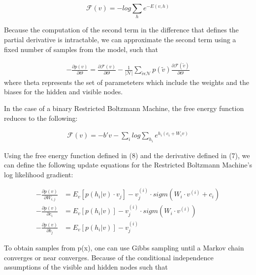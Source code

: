 \documentclass[journal]{IEEEtran}
\begin{document}
\begin{equation}
\mathcal{F}(v) = -log \sum\limits_{h}e^{-E(v,h)}
\end{equation}

Because the computation of the second term in the difference that defines the partial derivative is intractable, we can approximate the second term using a fixed number of samples from the model, such that 

\begin{equation}
\begin{aligned}
- \frac{\partial p(v)}{\partial \Theta} = \frac{\partial \mathcal{F}(v)}{\partial \Theta} -\frac{1}{|\mathcal{N}|} \sum\limits_{\tilde{v} \epsilon \mathcal{N}} p(\tilde{v}) \frac{\partial \mathcal{F}(\tilde{v})}{\partial \Theta}
\end{aligned}
\end{equation} where theta represents the set of parameteters which include the weights and the biases for the hidden and visible nodes.

In the case of a binary Restricted Boltzmann Machine, the free energy function reduces to the following:

\begin{equation}
\begin{aligned}
\mathcal{F}(v) = -b'v - \sum\limits_{i}log\sum\limits_{h_{i}}e^{h_{i}(c_{i}+W_{i}v)}
\end{aligned}
\end{equation}

Using the free energy function defined in (8) and the derivative defined in (7), we can define the following update equations for the Restricted Boltzmann Machine's log likelihood gradient:

\begin{equation}
\begin{aligned}
- \frac{\partial p(v)}{\partial W_{i,j}} &= E_{v}[p(h_{i}|v)\cdot v_{j}] - v_{j}^{(i)}\cdot sigm(W_{i} \cdot v^{(i)} + c_{i})\\
- \frac{\partial p(v)}{\partial c_{i}} &= E_{v}[p(h_{i}|v)] - v_{j}^{(i)}\cdot sigm(W_{i} \cdot v^{(i)})\\
- \frac{\partial p(v)}{\partial b_{j}} &= E_{v}[p(h_{i}|v)] - v_{j}^{(i)}
\end{aligned}
\end{equation}

To obtain samples from p(x), one can use Gibbs sampling until a Markov chain converges or near converges.  Because of the conditional independence assumptions of the visible and hidden nodes such that 
\end{document}
